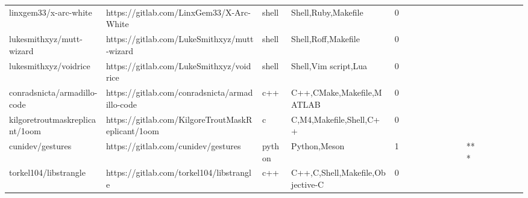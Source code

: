 \begin{tabular}{llllrlllllllllllll}
linxgem33/x-arc-white                              &           https://gitlab.com/LinxGem33/X-Arc-White &             shell &                                Shell,Ruby,Makefile &       0 &         &        &           &                &                 &        &           &           &          &          &       &              &          \\
lukesmithxyz/mutt-wizard                           &        https://gitlab.com/LukeSmithxyz/mutt-wizard &             shell &                                Shell,Roff,Makefile &       0 &         &        &           &                &                 &        &           &           &          &          &       &              &          \\
lukesmithxyz/voidrice                              &           https://gitlab.com/LukeSmithxyz/voidrice &             shell &                               Shell,Vim script,Lua &       0 &         &        &           &                &                 &        &           &           &          &          &       &              &          \\
conradsnicta/armadillo-code                        &     https://gitlab.com/conradsnicta/armadillo-code &               c++ &                          C++,CMake,Makefile,MATLAB &       0 &         &        &           &                &                 &        &           &           &          &          &       &              &          \\
kilgoretroutmaskreplicant/1oom                     &  https://gitlab.com/KilgoreTroutMaskReplicant/1oom &                 c &                            C,M4,Makefile,Shell,C++ &       0 &         &        &           &                &                 &        &           &           &          &          &       &              &          \\
cunidev/gestures                                   &                https://gitlab.com/cunidev/gestures &            python &                                       Python,Meson &       1 &         &        &           &                &                 &        &           &       *** &          &          &       &              &          \\
torkel104/libstrangle                              &           https://gitlab.com/torkel104/libstrangle &               c++ &                   C++,C,Shell,Makefile,Objective-C &       0 &         &        &           &                &                 &        &           &           &          &          &       &              &          \\

\end{tabular}
